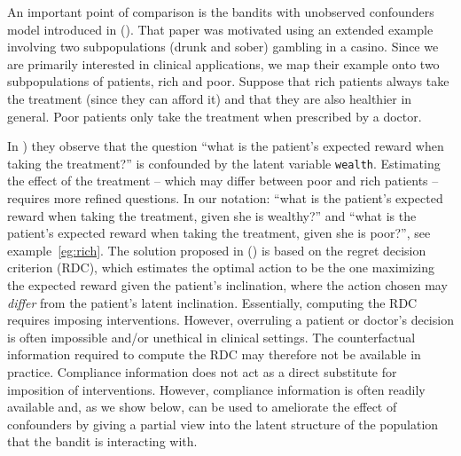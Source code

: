 An important point of comparison is the bandits with unobserved confounders model introduced in (\cite{bareinboim:15}). That paper was motivated using an extended example involving two subpopulations (drunk and sober) gambling in a casino. Since we are primarily interested in clinical applications, we map their example onto two subpopulations of patients, rich and poor. Suppose that rich patients always take the treatment (since they can afford it) and that they are also healthier in general. Poor patients only take the treatment when prescribed by a doctor.

In \cite{bareinboim:15}) they observe that the question ``what is the patient's expected reward when taking the treatment?'' is confounded by the latent variable \texttt{wealth}. Estimating the effect of the treatment -- which may differ between poor and rich patients -- requires more refined questions. In our notation: 
``what is the patient's expected reward when taking the treatment, given she is wealthy?'' and  ``what is the patient's expected reward when taking the treatment, given she is poor?'', see example~\ref{eg:rich}.
The solution proposed in (\cite{bareinboim:15}) is based on the regret decision criterion (RDC), which estimates the optimal action to be the one maximizing the expected reward given the patient's inclination, where the action chosen may \emph{differ} from the patient's latent inclination. Essentially, computing the RDC requires imposing interventions. However, overruling a patient or doctor's decision is often impossible and/or unethical in clinical settings. The counterfactual information required to compute the RDC may therefore not be available in practice.
Compliance information does not act as a direct substitute for imposition of interventions. However, compliance information is often readily available and, as we show below, can be used to ameliorate the effect of confounders by giving a partial view into the latent structure of the population that the bandit is interacting with.

